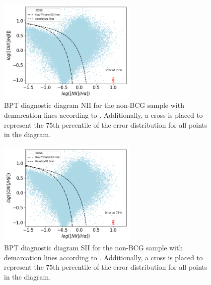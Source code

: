\begin{figure}[hbtp]
  \centering
  \includegraphics[width=0.6\textwidth]{SDSS-NII-V22}
  \caption{BPT diagnostic diagram NII for the non-BCG sample with demarcation lines according to \cite{2006MNRAS.372..961K}.
  Additionally, a cross is placed to represent the 75th percentile of the error distribution for all points in the diagram. }
  \label{6}
\end{figure}

\begin{figure}[hbtp]
  \centering
  \includegraphics[width=0.6\textwidth]{SDSS-NII-V22}
  \caption{BPT diagnostic diagram SII for the non-BCG sample with demarcation lines according to \cite{2006MNRAS.372..961K}.
  Additionally, a cross is placed to represent the 75th percentile of the error distribution for all points in the diagram. }
  \label{7}
\end{figure}

\newpage
